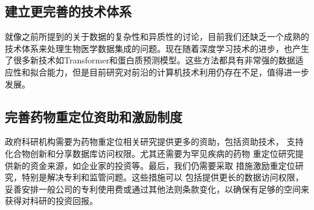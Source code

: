 \subsection{建立更完善的技术体系}
就像之前所提到的关于数据的复杂性和异质性的讨论，目前我们还缺乏一个成熟的技术体系来处理生物医学数据集成的问题。现在随着深度学习技术的进步，也产生了很多新技术如Transformer和蛋白质预测模型。这些方法都具有非常强的数据适应性和拟合能力，但是目前研究对前沿的计算机技术利用仍存在不足，值得进一步发展。

\subsection{完善药物重定位资助和激励制度}
政府科研机构需要为药物重定位相关研究提供更多的资助，包括资助技术，
支持化合物创新和分享数据库访问权限。尤其还需要为罕见疾病的药物
重定位研究提供新的资金来源，如企业家的投资等。最后，我们仍需要采取
措施激励重定位研究，特别是解决专利和监管问题。这些措施可以
包括提供更长的数据访问权限，妥善安排一般公司的专利使用费或通过其他法则条款变化，以确保有足够的空间来获得对科研的投资回报\cite{pushpakomDrugRepurposingProgress2019}。


\newpage
\begingroup
    \printbibliography[title={参考文献}]
\endgroup

